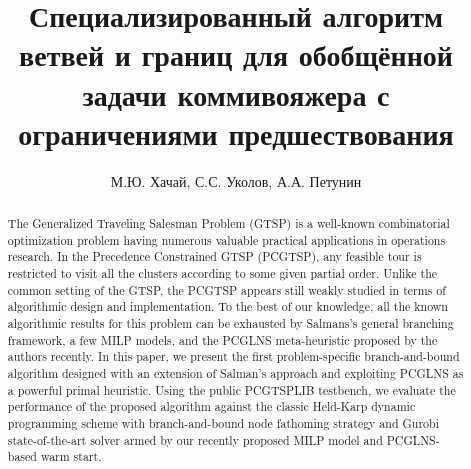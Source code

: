 \documentclass{article}
\author{М.Ю. Хачай, С.С. Уколов, А.А. Петунин}
\title{
Специализированный алгоритм ветвей и границ
для обобщённой задачи коммивояжера
с ограничениями предшествования
}
\begin{document}
\maketitle

\begin{abstract}
The Generalized Traveling Salesman Problem (GTSP) is a well-known combinatorial optimization problem having numerous valuable practical applications in operations research. In the Precedence Constrained GTSP (PCGTSP), any feasible tour is restricted to visit all the clusters according to some given partial order. Unlike the common setting of the GTSP, the PCGTSP appears still weakly studied in terms of algorithmic design and implementation.
To the best of our knowledge, all the known algorithmic results for this problem can be exhausted by Salmans's general branching framework, a few MILP models, and the PCGLNS meta-heuristic proposed by the authors recently. In this paper, we present the first problem-specific branch-and-bound algorithm designed with an extension of Salman's approach and exploiting PCGLNS as a powerful primal heuristic.   Using the public PCGTSPLIB testbench, we evaluate the performance of the proposed algorithm against the classic Held-Karp dynamic programming scheme with branch-and-bound node fathoming strategy and Gurobi state-of-the-art solver armed by our recently proposed MILP model and PCGLNS-based warm start. 
\end{abstract}  


% 







% 
% 
% 
\printbibliography[]
\end{document}
